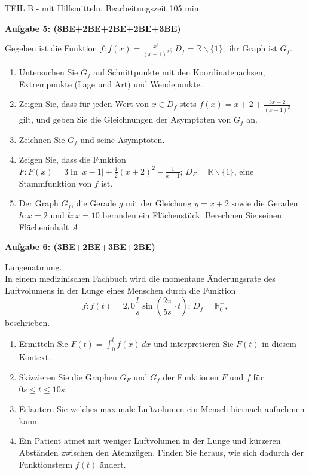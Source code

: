 \documentclass[a4paper,12pt]{article}
\newcommand{\Aufgabe}[1]{
  {
  \vspace*{0.5cm}
  \textsf{\textbf{Aufgabe #1}}
  \vspace*{0.2cm}
  
  }
}
\begin{document}
\newpage
\vspace{1,5cm} {TEIL B} - mit Hilfsmitteln. Bearbeitungszeit 105 min.
\vspace {0,2cm}

\Aufgabe{5: (8BE+2BE+2BE+2BE+3BE)}
Gegeben ist die Funktion $f: f(x) = \frac{x^3}{(x-1)^2};\, D_f=\mathbb{R}\backslash\{1\};$ ihr Graph ist $G_f$.
\begin{enumerate}[label={\alph*)}]
  \item Untersuchen Sie $G_f$ auf Schnittpunkte mit den Koordinatenachsen, Extrempunkte (Lage und Art) und Wendepunkte.
  \item Zeigen Sie, dass für jeden Wert von $x\in D_f$ stets $f(x) = x+2+\frac{3x-2}{(x-1)^2}$ gilt, und geben Sie die Gleichnungen der Asymptoten von $G_f$ an.
  \item Zeichnen Sie $G_f$ und seine Asymptoten.
  \item Zeigen Sie, dass die Funktion $F: F(x) = 3 \ln |x-1| + \frac{1}{2}(x+2)^2 - \frac{1}{x-1};\, D_F=\mathbb{R}\backslash\{1\}$, eine Stammfunktion von $f$ ist.
  \item Der Graph $G_f$, die Gerade $g$ mit der Gleichung $y=x+2$ sowie die Geraden $h: x=2$ und $k: x=10$ beranden ein Flächenstück. Berechnen Sie seinen Flächeninhalt $A$.
\end{enumerate}

\Aufgabe{6: (3BE+2BE+3BE+2BE)}
Lungenatmung.\\
In einem medizinischen Fachbuch wird die momentane Änderungsrate des Luftvolumens in der Lunge eines Menschen durch die Funktion
\[f:f(t) = 2,0\frac{l}{s}\sin (\frac{2\pi}{5s}\cdot t);\, D_f=\mathbb{R}_0^+,\] beschrieben.
\begin{enumerate}[label={\alph*)}]
  \item Ermitteln Sie $F(t)=\int_0^t f(x)\, dx$ und interpretieren Sie $F(t)$ in diesem Kontext.
  \item Skizzieren Sie die Graphen $G_F$ und $G_f$ der Funktionen $F$ und $f$ für $0 s \le t \le 10 s$.
  \item Erläutern Sie welches maximale Luftvolumen ein Mensch hiernach aufnehmen kann.
  \item Ein Patient atmet mit weniger Luftvolumen in der Lunge und kürzeren Abständen zwischen den Atemzügen. Finden Sie heraus, wie sich dadurch der Funktionsterm $f(t)$ ändert.
\end{enumerate}
\end{document}
